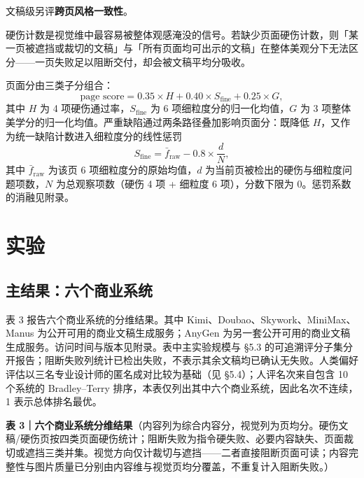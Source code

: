 文稿级另评\textbf{跨页风格一致性}。

硬伤计数是视觉维中最容易被整体观感淹没的信号。若缺少页面硬伤计数，则「某一页被遮挡或裁切的文稿」与「所有页面均可出示的文稿」在整体美观分下无法区分------一页失败足以阻断交付，却会被文稿平均分吸收。

页面分由三类子分组合： \[\text{page score} = 0.35\times H + 0.40\times S_{\text{fine}} + 0.25\times G,\] 其中 \(H\) 为 4 项硬伤通过率，\(S_{\text{fine}}\) 为 6 项细粒度分的归一化均值，\(G\) 为 3 项整体美学分的归一化均值。严重缺陷通过两条路径叠加影响页面分：既降低 \(H\)，又作为统一缺陷计数进入细粒度分的线性惩罚 \[S_{\text{fine}} = \bar{f}_{\text{raw}} - 0.8\times\frac{d}{N},\] 其中 \(\bar{f}_{\text{raw}}\) 为该页 6 项细粒度分的原始均值，\(d\) 为当前页被检出的硬伤与细粒度问题项数，\(N\) 为总观察项数（硬伤 4 项 + 细粒度 6 项），分数下限为 0。惩罚系数的消融见附录。

\section{实验}\label{ux5b9eux9a8c}

\subsection{主结果：六个商业系统}\label{ux4e3bux7ed3ux679cux516dux4e2aux5546ux4e1aux7cfbux7edf}

表 3 报告六个商业系统的分维结果。其中 Kimi、Doubao、Skywork、MiniMax、Manus 为公开可用的商业文稿生成服务；AnyGen 为另一套公开可用的商业文稿生成服务。访问时间与版本见附录。表中主实验规模与 §5.3 的可追溯评分子集分开报告；阻断失败列统计已检出失败，不表示其余文稿均已确认无失败。人类偏好评估以三名专业设计师的匿名成对比较为基础（见 §5.4）；人评名次来自包含 10 个系统的 Bradley--Terry 排序，本表仅列出其中六个商业系统，因此名次不连续，1 表示总体排名最优。

\textbf{表 3｜六个商业系统分维结果}（内容列为综合内容分，视觉列为页均分。硬伤文稿/硬伤页按四类页面硬伤统计；阻断失败为指令硬失败、必要内容缺失、页面裁切或遮挡三类并集。视觉方向仅计裁切与遮挡------二者直接阻断页面可读；内容完整性与图片质量已分别由内容维与视觉页均分覆盖，不重复计入阻断失败。）

